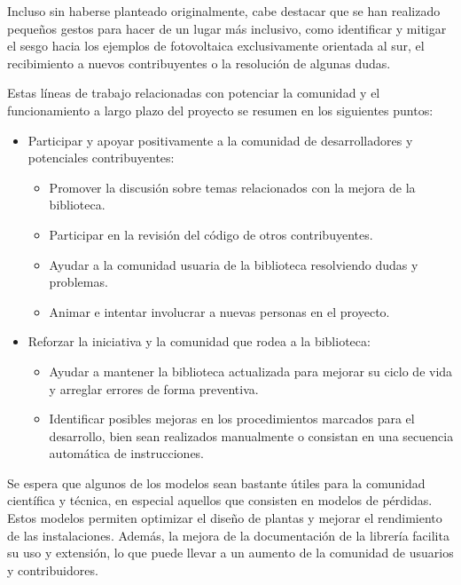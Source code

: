 Incluso sin haberse planteado originalmente, cabe destacar que se han realizado pequeños gestos para hacer de \pvlibpy{} un lugar más inclusivo, como identificar y mitigar el sesgo hacia los ejemplos de fotovoltaica exclusivamente orientada al sur, el recibimiento a nuevos contribuyentes o la resolución de algunas dudas.

Estas líneas de trabajo relacionadas con potenciar la comunidad y el funcionamiento a largo plazo del proyecto se resumen en los siguientes puntos:

\begin{itemize}
    \item Participar y apoyar positivamente a la comunidad de desarrolladores y potenciales contribuyentes:
          \begin{itemize}
              \item Promover la discusión sobre temas relacionados con la mejora de la biblioteca.

              \item Participar en la revisión del código de otros contribuyentes.

              \item Ayudar a la comunidad usuaria de la biblioteca resolviendo dudas y problemas.

              \item Animar e intentar involucrar a nuevas personas en el proyecto.
          \end{itemize}

    \item Reforzar la iniciativa y la comunidad que rodea a la biblioteca:
          \begin{itemize}
              \item Ayudar a mantener la biblioteca actualizada para mejorar su ciclo de vida y arreglar errores de forma preventiva.

              \item Identificar posibles mejoras en los procedimientos marcados para el desarrollo, bien sean realizados manualmente o consistan en una secuencia automática de instrucciones.
          \end{itemize}

\end{itemize}

Se espera que algunos de los modelos sean bastante útiles para la comunidad científica y técnica, en especial aquellos que consisten en modelos de pérdidas. Estos modelos permiten optimizar el diseño de plantas y mejorar el rendimiento de las instalaciones. Además, la mejora de la documentación de la librería \pvlibpy{} facilita su uso y extensión, lo que puede llevar a un aumento de la comunidad de usuarios y contribuidores.

